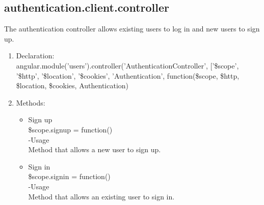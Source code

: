 \documentclass[a4paper,12pt]{article}
\begin{document}
\subsection{authentication.client.controller}
The authentication controller allows existing users to log in and new users to sign up.
\begin{enumerate}
\item Declaration: \\angular.module('users').controller('AuthenticationController', ['\$scope', '\$http', '\$location', '\$cookies', 'Authentication',
	function(\$scope, \$http, \$location, \$cookies, Authentication)
\item Methods:
	\begin{itemize}
 	\item Sign up \\
	 \$scope.signup = function()\\
 	-Usage\\
	 Method that allows a new user to sign up.
	 \item Sign in\\
  	\$scope.signin = function()\\
	 -Usage\\
 	Method that allows an existing user to sign in.
 \end{itemize}	
\end{enumerate}
\end{document}
